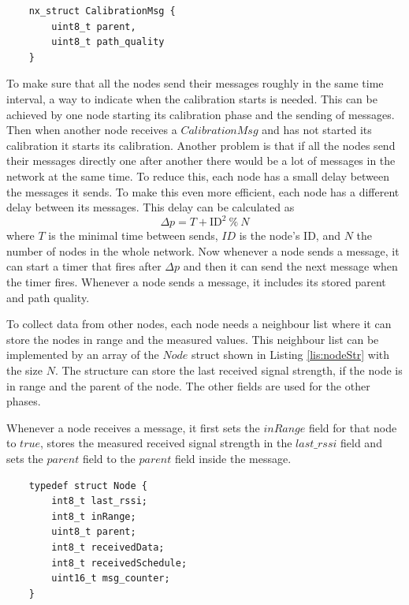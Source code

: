 \begin{lstlisting}
	nx_struct CalibrationMsg {
		uint8_t parent,
		uint8_t path_quality
	}
\end{lstlisting}

To make sure that all the nodes send their messages roughly in the same time interval, a way to indicate when the calibration starts is needed. This can be achieved by one node starting its calibration phase and the sending of messages. Then when another node receives a $CalibrationMsg$ and has not started its calibration it starts its calibration. Another problem is that if all the nodes send their messages directly one after another there would be a lot of messages in the network at the same time. To reduce this, each node has a small delay between the messages it sends. To make this even more efficient, each node has a different delay between its messages. This delay can be calculated as  
\[ \Delta p = T + \mbox{ID}^2\ \%\ N\]
where $T$ is the minimal time between sends, $ID$ is the node's ID, and $N$ the number of nodes in the whole network. Now whenever a node sends a message, it can start a timer that fires after $\Delta p$ and then it can send the next message when the timer fires. Whenever a node sends a message, it includes its stored parent and path quality.  

To collect data from other nodes, each node needs a neighbour list where it can store the nodes in range and the measured values. This neighbour list can be implemented by an array of the $Node$ struct shown in Listing \ref{lis:nodeStr} with the size $N$. The structure can store the last received signal strength, if the node is in range and the parent of the node. The other fields are used for the other phases. 

Whenever a node receives a message, it first sets the $inRange$ field for that node to $true$, stores the measured received signal strength in the $last\_rssi$ field and sets the $parent$ field to the $parent$ field inside the message. 
 

\begin{lstlisting}
	typedef struct Node {
  		int8_t last_rssi;
  		int8_t inRange;
  		uint8_t parent;
  		int8_t receivedData;
  		int8_t receivedSchedule;
  		uint16_t msg_counter;
	}
\end{lstlisting}

